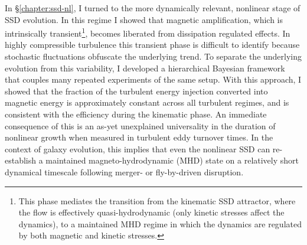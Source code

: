 \documentclass[12pt,twoside]{extreport}
\begin{document}
In \S\ref{chapter:ssd-nl}, I turned to the more dynamically relevant, nonlinear stage of SSD evolution. In this regime I showed that magnetic amplification, which is intrinsically transient\footnote{
    This phase mediates the transition from the kinematic SSD attractor, where the flow is effectively quasi-hydrodynamic (only kinetic stresses affect the dynamics), to a maintained MHD regime in which the dynamics are regulated by both magnetic and kinetic stresses.
}, becomes liberated from dissipation regulated effects. In highly compressible turbulence this transient phase is difficult to identify because stochastic fluctuations obfuscate the underlying trend. To separate the underlying evolution from this variability, I developed a hierarchical Bayesian framework that couples many repeated experiments of the same setup. With this approach, I showed that the fraction of the turbulent energy injection converted into magnetic energy is approximately constant across all turbulent regimes, and is consistent with the efficiency during the kinematic phase. An immediate consequence of this is an as-yet unexplained universality in the duration of nonlinear growth when measured in turbulent eddy turnover times. In the context of galaxy evolution, this implies that even the nonlinear SSD can re-establish a maintained magneto-hydrodynamic (MHD) state on a relatively short dynamical timescale following merger- or fly-by-driven disruption.
\end{document}
